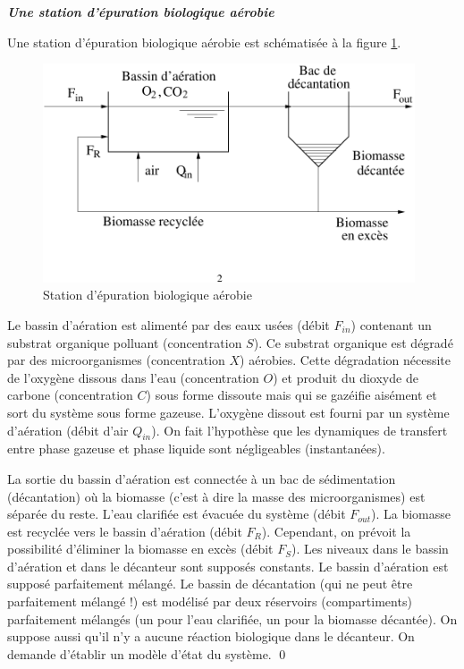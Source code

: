 \begin{exercice}{\bf \em Une station d'épuration biologique aérobie}

Une station d'épuration biologique aérobie est schématisée à la
figure \ref{Fig:epurat}.
\begin{figure}[htbp] 
   \centering
   \includegraphics[width=11cm]{epurat} 
   \caption{Station d'épuration biologique aérobie}
   \label{Fig:epurat}
\end{figure}
Le bassin d'aération est alimenté par des eaux  usées
(débit
$F_{in}$) contenant un substrat organique polluant  (concentration $S$). 
Ce substrat organique est dégradé par des microorganismes
(concentration $X$) aérobies.  Cette dégradation nécessite de
l'oxygène dissous dans l'eau (concentration $O$) et produit du dioxyde
de carbone (concentration
$C$) sous forme dissoute mais qui se gazéifie aisément et sort du
système sous forme gazeuse.  L'oxygène dissout est fourni par un
système d'aération (débit d'air $Q_{in}$).  On fait l'hypothèse que
les dynamiques de transfert entre phase gazeuse et phase liquide sont
négligeables (instantanées).

La sortie du bassin d'aération est connectée à un bac de
sédimentation (décantation) où la biomasse (c'est à dire la masse 
des microorganismes) est séparée du reste.  L'eau clarifiée est
évacuée du système (débit $F_{out}$).  La biomasse est recyclée
vers le bassin d'aération (débit $F_R$).  Cependant, on prévoit la
possibilité d'éliminer la biomasse en excès (débit $F_S$).  Les
niveaux dans le bassin d'aération et dans le décanteur sont
supposés constants.  Le bassin d'aération est supposé parfaitement
mélangé.  Le bassin de décantation (qui ne peut être
parfaitement mélangé !) est modélisé par deux réservoirs
(compartiments) parfaitement mélangés (un pour l'eau clarifiée, un
pour la biomasse décantée).  On suppose aussi qu'il n'y a aucune
réaction biologique dans le décanteur. On demande d'établir un modèle d'état du système. \qed
\end{exercice}
\vv


